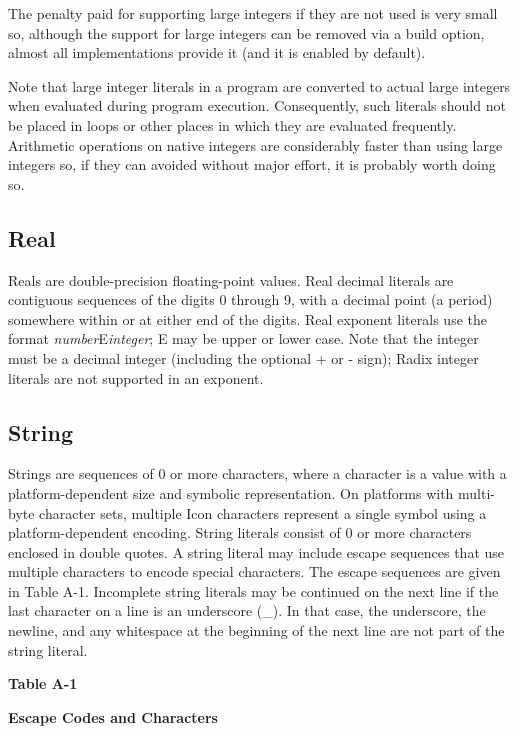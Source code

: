 The penalty paid for supporting large integers if they are not used is
very small so, although the support for large integers can be removed
via a build option, almost all implementations provide it (and it is
enabled by default).

Note that large integer literals in a program are converted to actual
large integers when evaluated during program execution. Consequently,
such literals should not be placed in loops or other places in which
they are evaluated frequently.  Arithmetic operations on native
integers are considerably faster than using large integers so, if they
can avoided without major effort, it is probably worth doing so.

\subsection*{Real}

Reals are double-precision floating-point values.
Real decimal literals are contiguous sequences of the digits 0 through
9, with a decimal point (a period) somewhere within or at either end of
the digits. Real exponent literals use the format
\textit{number}E\textit{integer}; E may be upper or lower case.
Note that the integer must be a decimal integer (including the optional
+ or - sign); Radix integer literals are not supported in an exponent.

\subsection*{String}

Strings are sequences of 0 or more characters, where a
character is a value with a platform-dependent size and symbolic
representation. On platforms with multi-byte character sets, multiple
Icon characters represent a single symbol using a platform-dependent
encoding.
String literals consist of 0 or more characters enclosed in double
quotes. A string literal may include escape sequences that use multiple
characters to encode special characters. The escape sequences are given
in Table A-1. Incomplete string literals may
be continued on the next line if the last character on a line is an
underscore (\_). In that case, the underscore, the newline, and any
whitespace at the beginning of the next line are not part of the string
literal.

\begin{center}
{\sffamily\bfseries Table A-1}

{\sffamily\bfseries Escape Codes and Characters}
\end{center}

